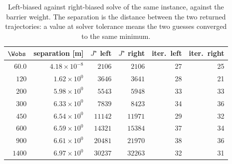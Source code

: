 \begin{table}[htbp]
  \centering
  \small
  \caption{Left-biased against right-biased solve of the same instance, against the barrier weight. The separation is the distance between the two returned trajectories: a value at solver tolerance means the two guesses converged to the same minimum.}
  \label{res:tab:bif}
  \begin{tabular}{rrrrrr}
    \toprule
    $\Wobs$ & separation [m] & $J^\star$ left & $J^\star$ right & iter.\ left & iter.\ right \\
    \midrule
    $60.0$ & $4.18\times 10^{-8}$ & $2106$ & $2106$ & 27 & 25 \\
    $120$ & $1.62\times 10^{0}$ & $3646$ & $3641$ & 28 & 21 \\
    $200$ & $5.98\times 10^{0}$ & $5543$ & $5948$ & 33 & 33 \\
    $300$ & $6.33\times 10^{0}$ & $7839$ & $8423$ & 34 & 36 \\
    $450$ & $6.54\times 10^{0}$ & $11142$ & $11971$ & 29 & 32 \\
    $600$ & $6.59\times 10^{0}$ & $14321$ & $15384$ & 37 & 34 \\
    $900$ & $6.61\times 10^{0}$ & $20481$ & $21970$ & 38 & 36 \\
    $1400$ & $6.97\times 10^{0}$ & $30237$ & $32263$ & 32 & 31 \\
    \bottomrule
  \end{tabular}
\end{table}

